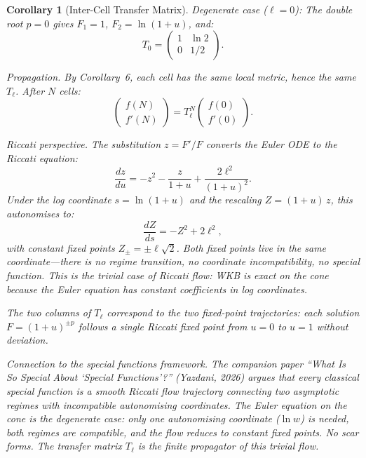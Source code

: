 \documentclass[12pt]{amsart}
\newtheorem{corollary}{Corollary}
\begin{document}
\begin{corollary}[Inter-Cell Transfer Matrix]
\textit{Degenerate case} ($\ell = 0$): The double root $p = 0$ gives $F_1 = 1$,
$F_2 = \ln(1+u)$, and:
\[
  T_0 = \begin{pmatrix} 1 & \ln 2 \\ 0 & 1/2 \end{pmatrix}.
\]

\textit{Propagation.} By Corollary~6, each cell has the same local metric, hence the same
$T_\ell$. After $N$ cells:
\[
  \begin{pmatrix} f(N) \\ f'(N) \end{pmatrix}
    = T_\ell^N \begin{pmatrix} f(0) \\ f'(0) \end{pmatrix}.
\]

\textit{Riccati perspective.} The substitution $z = F'/F$ converts the Euler ODE to the
Riccati equation:
\[
  \frac{dz}{du} = -z^2 - \frac{z}{1+u} + \frac{2\ell^2}{(1+u)^2}.
\]
Under the log coordinate $s = \ln(1+u)$ and the rescaling $Z = (1+u)\, z$, this autonomises to:
\[
  \frac{dZ}{ds} = -Z^2 + 2\ell^2,
\]
with constant fixed points $Z_\pm = \pm\ell\sqrt{2}$. Both fixed points live in the same
coordinate---there is no regime transition, no coordinate incompatibility, no special function.
This is the trivial case of Riccati flow: WKB is exact on the cone because the Euler equation
has constant coefficients in log coordinates.

The two columns of $T_\ell$ correspond to the two fixed-point trajectories: each solution
$F = (1+u)^{\pm p}$ follows a single Riccati fixed point from $u = 0$ to $u = 1$ without
deviation.

\textit{Connection to the special functions framework.} The companion paper ``What Is So
Special About `Special Functions'?'' (Yazdani, 2026) argues that every classical special
function is a smooth Riccati flow trajectory connecting two asymptotic regimes with incompatible
autonomising coordinates. The Euler equation on the cone is the degenerate case: only one
autonomising coordinate ($\ln w$) is needed, both regimes are compatible, and the flow reduces
to constant fixed points. No scar forms. The transfer matrix $T_\ell$ is the finite propagator
of this trivial flow.


\end{corollary}
\end{document}
